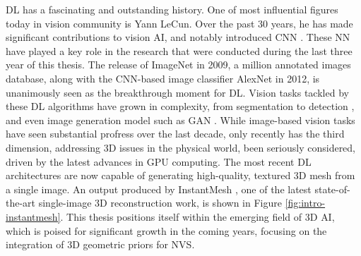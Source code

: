 \ac{DL} has a fascinating and outstanding history. One of most influential figures today in vision community is Yann LeCun. Over the past 30 years, he has made significant contributions to vision \ac{AI}, and notably introduced \ac{CNN} \citep{lecun1998gradient}. These \ac{NN} have played a key role in the research that were conducted during the last three year of this thesis. The release of ImageNet \citep{deng2009imagenet} in 2009, a million annotated images database, along with the \ac{CNN}-based image classifier AlexNet \citep{krizhevsky2012imagenet} in 2012, is unanimously seen as the breakthrough moment for \ac{DL}. Vision tasks tackled by these \ac{DL} algorithms have grown in complexity, from segmentation \citep{long2015fully} to detection \citep{girshick2015fast}, and even image generation model such as \ac{GAN} \citep{goodfellow2014generative}. While image-based vision tasks have seen substantial profress over the last decade, only recently has the third dimension, addressing 3D issues in the physical world, been seriously considered, driven by the latest advances in \ac{GPU} computing. The most recent \ac{DL} architectures are now capable of generating high-quality, textured 3D mesh from a single image. An output produced by InstantMesh \citep{xu2024instantmesh}, one of the latest state-of-the-art single-image 3D reconstruction work, is shown in Figure \ref{fig:intro-instantmesh}. This thesis positions itself within the emerging field of 3D \ac{AI}, which is poised for significant growth in the coming years, focusing on the integration of 3D geometric priors for \ac{NVS}.  


